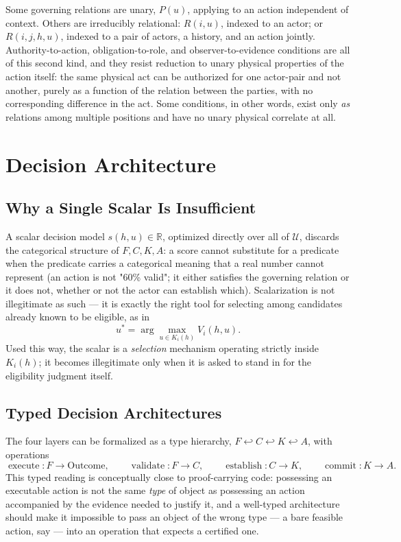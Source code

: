 \documentclass[11pt]{report}
\theoremstyle{definition}
\theoremstyle{plain}
\newcommand{\Uni}{\mathcal{U}}
\begin{document}
Some governing relations are unary, $P(u)$, applying to an action independent of context. Others are irreducibly relational: $R(i,u)$, indexed to an actor; or $R(i,j,h,u)$, indexed to a pair of actors, a history, and an action jointly. Authority-to-action, obligation-to-role, and observer-to-evidence conditions are all of this second kind, and they resist reduction to unary physical properties of the action itself: the same physical act can be authorized for one actor-pair and not another, purely as a function of the relation between the parties, with no corresponding difference in the act. Some conditions, in other words, exist only \emph{as} relations among multiple positions and have no unary physical correlate at all.

\part{Decision Architecture}

\chapter{Why a Single Scalar Is Insufficient}

A scalar decision model $s(h,u) \in \mathbb{R}$, optimized directly over all of $\Uni$, discards the categorical structure of $F,C,K,A$: a score cannot substitute for a predicate when the predicate carries a categorical meaning that a real number cannot represent (an action is not "60\% valid"; it either satisfies the governing relation or it does not, whether or not the actor can establish which). Scalarization is not illegitimate as such --- it is exactly the right tool for selecting among candidates already known to be eligible, as in
\[
u^\ast = \arg\max_{u \in K_i(h)} V_i(h,u).
\]
Used this way, the scalar is a \emph{selection} mechanism operating strictly inside $K_i(h)$; it becomes illegitimate only when it is asked to stand in for the eligibility judgment itself.

\chapter{Typed Decision Architectures}

The four layers can be formalized as a type hierarchy, $F \hookleftarrow C \hookleftarrow K \hookleftarrow A$, with operations
\[
\operatorname{execute}: F \to \text{Outcome}, \qquad
\operatorname{validate}: F \to C, \qquad
\operatorname{establish}: C \to K, \qquad
\operatorname{commit}: K \to A.
\]
This typed reading is conceptually close to proof-carrying code: possessing an executable action is not the same \emph{type} of object as possessing an action accompanied by the evidence needed to justify it, and a well-typed architecture should make it impossible to pass an object of the wrong type --- a bare feasible action, say --- into an operation that expects a certified one.
\end{document}
